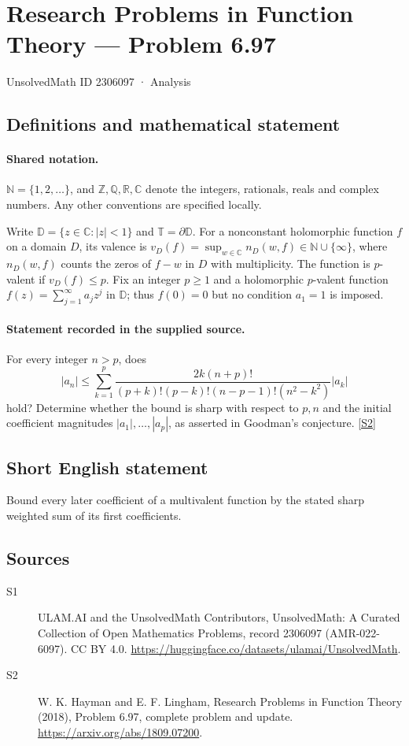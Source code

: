 \documentclass[11pt]{article}
\newcommand{\sref}[2]{\hyperlink{source:#1:#2}{[S#2]}}
\begin{document}
\setcounter{section}{2306096}
\section{Research Problems in Function Theory — Problem 6.97}\label{2306097}
{\small\sffamily UnsolvedMath ID 2306097 · Analysis}
\subsection{Definitions and mathematical statement}

\paragraph{Shared notation.}$\mathbb N=\{1,2,\ldots\}$, and $\mathbb Z,\mathbb Q,\mathbb R,\mathbb C$ denote the integers, rationals, reals and complex numbers. Any other conventions are specified locally.


Write $\mathbb D=\{z\in\mathbb C:|z|<1\}$ and $\mathbb T=\partial\mathbb D$. For a nonconstant holomorphic function $f$ on a domain $D$, its valence is $v_D(f)=\sup_{w\in\mathbb C}n_D(w,f)\in\mathbb N\cup\{\infty\}$, where $n_D(w,f)$ counts the zeros of $f-w$ in $D$ with multiplicity. The function is $p$-valent if $v_D(f)\leq p$. Fix an integer $p\geq1$ and a holomorphic $p$-valent function $f(z)=\sum_{j=1}^{\infty}a_jz^j$ in $\mathbb D$; thus $f(0)=0$ but no condition $a_1=1$ is imposed.
\paragraph{Statement recorded in the supplied source.}
For every integer $n>p$, does
\[|a_n|\leq\sum_{k=1}^{p}\frac{2k(n+p)!}{(p+k)!(p-k)!(n-p-1)!(n^2-k^2)}|a_k|\]
hold? Determine whether the bound is sharp with respect to $p,n$ and the initial coefficient magnitudes $|a_1|,\ldots,|a_p|$, as asserted in Goodman's conjecture. \sref{2306097}{2}
\subsection{Short English statement}
Bound every later coefficient of a multivalent function by the stated sharp weighted sum of its first coefficients.
\subsection{Sources}
\begin{description}
\item[\hypertarget{source:2306097:1}{S1}] ULAM.AI and the UnsolvedMath Contributors, UnsolvedMath: A Curated Collection of Open Mathematics Problems, record 2306097 (AMR-022-6097). CC BY 4.0. \url{https://huggingface.co/datasets/ulamai/UnsolvedMath}.
\item[\hypertarget{source:2306097:2}{S2}] W. K. Hayman and E. F. Lingham, Research Problems in Function Theory (2018), Problem 6.97, complete problem and update. \url{https://arxiv.org/abs/1809.07200}.
\end{description}
\label{end:2306097}
\end{document}
